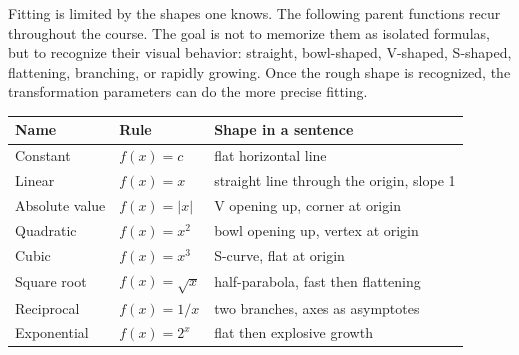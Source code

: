 \documentclass[12pt]{book}
\begin{document}
Fitting is limited by the shapes one knows. The following parent functions recur
throughout the course. The goal is not to memorize them as isolated formulas, but to
recognize their visual behavior: straight, bowl-shaped, V-shaped, S-shaped,
flattening, branching, or rapidly growing. Once the rough shape is recognized, the
transformation parameters can do the more precise fitting.
\begin{center}
\renewcommand{\arraystretch}{1.4}
\begin{tabular}{@{}lll@{}}
\toprule
\textbf{Name} & \textbf{Rule} & \textbf{Shape in a sentence}\\
\midrule
Constant     & $f(x)=c$        & flat horizontal line\\
Linear       & $f(x)=x$        & straight line through the origin, slope 1\\
Absolute value & $f(x)=|x|$    & V opening up, corner at origin\\
Quadratic    & $f(x)=x^2$      & bowl opening up, vertex at origin\\
Cubic        & $f(x)=x^3$      & S-curve, flat at origin\\
Square root  & $f(x)=\sqrt{x}$ & half-parabola, fast then flattening\\
Reciprocal   & $f(x)=1/x$      & two branches, axes as asymptotes\\
Exponential  & $f(x)=2^x$      & flat then explosive growth\\
\bottomrule
\end{tabular}
\end{center}

\begin{center}
\end{center}
\end{document}
